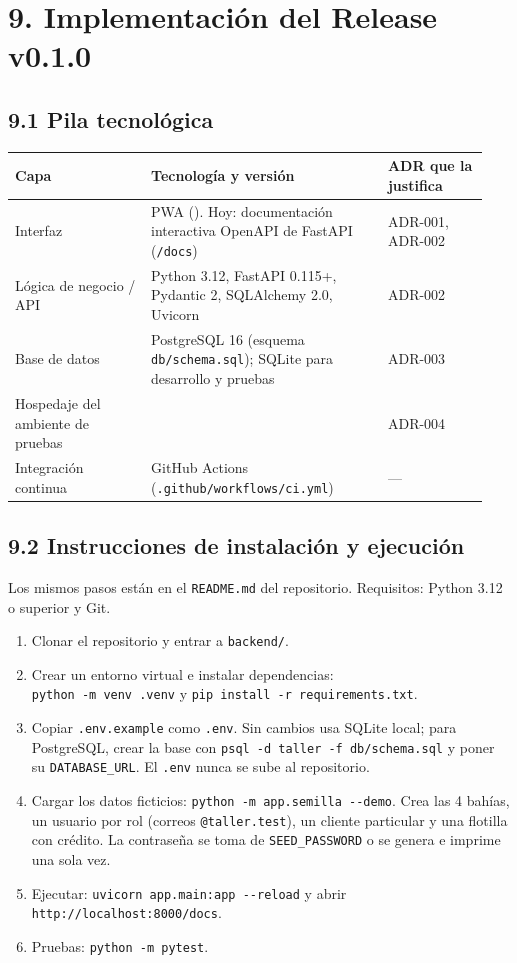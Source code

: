 \section{9. Implementación del Release
v0.1.0}\label{implementaciuxf3n-del-release-v0.1.0}

\subsection{9.1 Pila tecnológica}\label{pila-tecnoluxf3gica}

{\small
\begin{longtable}{@{}L{0.27\linewidth}L{0.47\linewidth}L{0.2\linewidth}@{}}
\toprule
\textbf{Capa} & \textbf{Tecnología y versión} & \textbf{ADR que la justifica} \\
\midrule
\endhead
\bottomrule
\endlastfoot
Interfaz & PWA (\pendiente{}). Hoy: documentación interactiva OpenAPI de FastAPI
(\texttt{/docs}) & ADR-001, ADR-002 \\
Lógica de negocio / API & Python 3.12, FastAPI 0.115+, Pydantic 2, SQLAlchemy 2.0, Uvicorn & ADR-002 \\
Base de datos & PostgreSQL 16 (esquema \texttt{db/schema.sql}); SQLite para desarrollo y pruebas & ADR-003 \\
Hospedaje del ambiente de pruebas & \pendiente{} & ADR-004 \\
Integración continua & GitHub Actions (\texttt{.github/workflows/ci.yml}) & --- \\
\end{longtable}
}

\subsection{9.2 Instrucciones de instalación y
ejecución}\label{instrucciones-de-instalaciuxf3n-y-ejecuciuxf3n}

Los mismos pasos están en el \texttt{README.md} del repositorio. Requisitos: Python 3.12 o superior y Git.

\begin{enumerate}
\tightlist
\item Clonar el repositorio y entrar a \texttt{backend/}.
\item Crear un entorno virtual e instalar dependencias:\\
\texttt{python -m venv .venv} y \texttt{pip install -r requirements.txt}.
\item Copiar \texttt{.env.example} como \texttt{.env}. Sin cambios usa SQLite local; para PostgreSQL,
crear la base con \texttt{psql -d taller -f db/schema.sql} y poner su \texttt{DATABASE\_URL}. El
\texttt{.env} nunca se sube al repositorio.
\item Cargar los datos ficticios: \texttt{python -m app.semilla -{}-demo}. Crea las 4 bahías, un usuario por
rol (correos \texttt{@taller.test}), un cliente particular y una flotilla con crédito. La contraseña se
toma de \texttt{SEED\_PASSWORD} o se genera e imprime una sola vez.
\item Ejecutar: \texttt{uvicorn app.main:app -{}-reload} y abrir \texttt{http://localhost:8000/docs}.
\item Pruebas: \texttt{python -m pytest}.
\end{enumerate}

